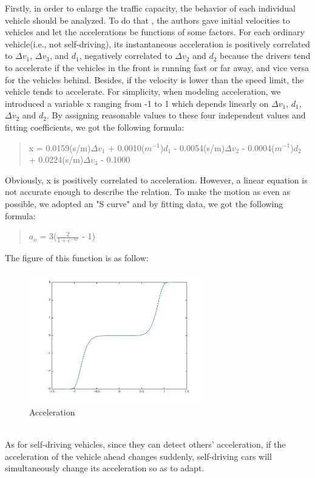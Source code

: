 \documentclass{icmmcm}
\begin{document}
Firstly, in order to enlarge the traffic capacity, the behavior of each individual vehicle should be analyzed. To do that , the authors gave  initial velocities to vehicles and let the accelerations be  functions of some factors. For each ordinary vehicle(i.e., not self-driving), its instantaneous acceleration is positively correlated to $\Delta$$v_{1}$, $\Delta$$v_{3}$, and $d_{1}$, negatively correlated to $\Delta$$v_{2}$ and $d_{2}$ because the drivers tend to accelerate if the vehicles in the front is running fast or far away, and vice versa for the vehicles behind. Besides, if the velocity is lower than the speed limit, the vehicle tends to accelerate. For simplicity, when modeling acceleration, we introduced a variable x ranging from -1 to 1 which depends linearly on  $\Delta$$v_{1}$,  $d_{1}$, $\Delta$$v_{2}$ and $d_{2}$. By assigning reasonable values to these four independent values and fitting coefficients, we got the following formula:
\begin{quotation}
 x = 0.0159(s/m)$\Delta$$v_{1}$ + 0.0010($m^{-1}$)$d_{1}$ - 0.0054(s/m)$\Delta$$v_{2}$ - 0.0004($m^{-1}$)$d_{2}$ + 0.0224(s/m)$\Delta$$v_{3}$ - 0.1000
\end{quotation}
Obviously, x is positively correlated to acceleration. However, a linear equation is not accurate enough to describe the relation. To make the motion as even as possible, we adopted an "S curve" and by fitting data, we got the following formula:\\
\begin{quotation}
$a_{o}$ = 3($\frac{2}{1 + e^{-4x}}$ - 1) %
\end{quotation}
The figure of this function is as follow:\\
\begin{figure}[!htp]
\centering
\includegraphics[height=5.7cm]{Acceleration.jpg}
\caption{Acceleration}
\end{figure}
\\
As for self-driving vehicles, since they can detect others' acceleration, if the acceleration of the vehicle ahead changes suddenly, self-driving cars will simultaneously change its acceleration so as to adapt.\\
\end{document}
